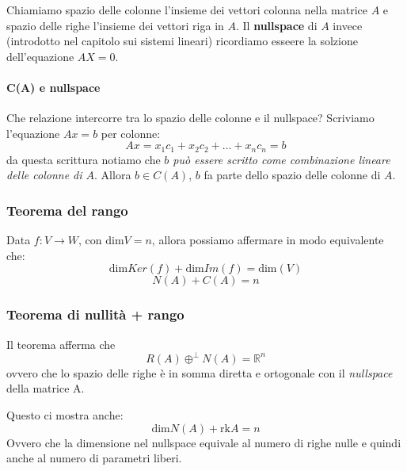 \documentclass[x11names]{article}
\begin{document}
Chiamiamo spazio delle colonne l'insieme dei vettori colonna nella matrice $A$ e spazio delle righe l'insieme dei vettori riga in  $A$. Il \textbf{nullspace} di $A$ invece (introdotto nel capitolo sui sistemi lineari) ricordiamo esseere la solzione dell'equazione  $AX = 0$.

\paragraph{C(A) e nullspace}

Che relazione intercorre tra lo spazio delle colonne e il nullspace?
Scriviamo l'equazione $Ax = b$ per colonne:
\[
	Ax = x_1c_1 + x_2c_{2} + \dots + x_{n}c_{n} = b
\] 
da questa scrittura notiamo che \textit{$b$ può essere scritto come combinazione lineare delle colonne di $A$}. Allora $b \in C\left(A\right)$, $b$ fa parte dello spazio delle colonne di $A$. 

\begin{center}
	\colorbox{myred}{\begin{minipage}{5.75in}
			\begin{redes}{}
								\subsubsection{Teorema del rango}
				Data $f: V \to W$, con $\text{dim}V = n$, allora possiamo affermare in modo equivalente che:
				\[
				\text{dim}Ker(f) + \text{dim}Im(f) = \text{dim}(V)
				\]
				\[
				N(A) + C(A) = n
				\]
				
				
			\end{redes}
	\end{minipage}}        
\end{center}

\begin{center}
	\colorbox{myred}{\begin{minipage}{5.75in}
			\begin{redes}{}
								\subsubsection{Teorema di nullità + rango}
				Il teorema afferma che
				\[
				R(A) \oplus^\perp N(A) = \mathbb{R}^n
				\]
				ovvero che lo spazio delle righe è in somma diretta e ortogonale con il \textit{nullspace} della matrice A.
				
				Questo ci mostra anche:
				\[
				\text{dim}N(A) + \text{rk}A = n
				\]
				Ovvero che la dimensione nel nullspace equivale al numero di righe nulle e quindi anche al numero di parametri liberi.
				
			\end{redes}
	\end{minipage}}        
\end{center}
\end{document}
